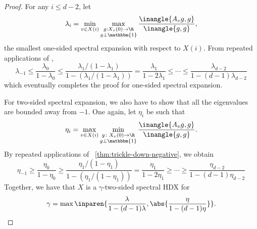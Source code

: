 \documentclass{toc}
\begin{document}
\begin{proof}
  For any $i \leq d-2$, let
  \[\lambda_i = \min_{v\in X(i)} \max_{\substack{g:X_v(0) \rightarrow \R\\g\perp \mathbbm{1}}}\frac{\inangle{A_v g,g}}{\inangle{g,g}},
  \]
  the smallest one-sided spectral expansion with respect to $X(i)$. From repeated applications of  ,
  \[
    \lambda_{-1} \leq \frac{\lambda_0}{1 - \lambda_0} \leq \frac{\lambda_{1}/(1-\lambda_{1})}{1 - (\lambda_{1}/(1-\lambda_{1}))} = \frac{\lambda_{1}}{1 - 2\lambda_{1}} \leq \cdots \leq \frac{\lambda_{d-2}}{1 - (d-1)\lambda_{d-2}}
  \]
  which eventually completes the proof for one-sided spectral expansion.

  For two-sided spectral expansion, we also have to show that all the eigenvalues are bounded away from $-1$. One again, let $\eta_i$ be such that
  \[
    \eta_i = \max_{v\in X(i)} \min_{\substack{g\colon X_v(0) \rightarrow \R\\g\perp \mathbbm{1}}}\frac{\inangle{A_v g,g}}{\inangle{g,g}}.    
  \]
  By repeated applications of ~\eqref{thm:trickle-down-negative}, we obtain
  \[
    \eta_{-1} \geq \frac{\eta_0}{1 - \eta_0} \geq \frac{\eta_{1}/(1-\eta_{1})}{1 - (\eta_{1}/(1-\eta_{1}))} = \frac{\eta_{1}}{1 - 2\eta_{1}} \geq \cdots \geq \frac{\eta_{d-2}}{1 - (d-1)\eta_{d-2}}
  \]
  Together, we have that $X$ is a $\gamma$-two-sided spectral HDX for
  \[
  \gamma = \max\inparen{\frac{\lambda}{1 - (d-1)\lambda}, \abs{\frac{\eta}{1 - (d-1)\eta}}}.\qedhere
  \]
  \end{proof}
\end{document}
